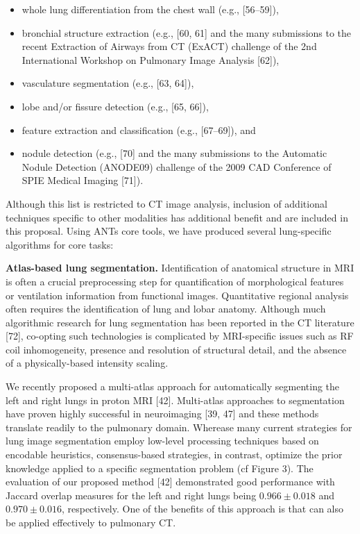 \documentclass[11pt,]{article}
\begin{document}
\begin{itemize}
\itemsep1pt\parskip0pt
\item
  whole lung differentiation from the chest wall (e.g., {[}56--59{]}),
\item
  bronchial structure extraction (e.g., {[}60, 61{]} and the many
  submissions to the recent Extraction of Airways from CT (ExACT)
  challenge of the 2nd International Workshop on Pulmonary Image
  Analysis {[}62{]}),
\item
  vasculature segmentation (e.g., {[}63, 64{]}),
\item
  lobe and/or fissure detection (e.g., {[}65, 66{]}),
\item
  feature extraction and classification (e.g., {[}67--69{]}), and
\item
  nodule detection (e.g., {[}70{]} and the many submissions to the
  Automatic Nodule Detection (ANODE09) challenge of the 2009 CAD
  Conference of SPIE Medical Imaging {[}71{]}).
\end{itemize}

Although this list is restricted to CT image analysis, inclusion of
additional techniques specific to other modalities has additional
benefit and are included in this proposal. Using ANTs core tools, we
have produced several lung-specific algorithms for core tasks:

\textbf{Atlas-based lung segmentation.} Identification of anatomical
structure in MRI is often a crucial preprocessing step for
quantification of morphological features or ventilation information from
functional images. Quantitative regional analysis often requires the
identification of lung and lobar anatomy. Although much algorithmic
research for lung segmentation has been reported in the CT literature
{[}72{]}, co-opting such technologies is complicated by MRI-specific
issues such as RF coil inhomogeneity, presence and resolution of
structural detail, and the absence of a physically-based intensity
scaling.

We recently proposed a multi-atlas approach for automatically segmenting
the left and right lungs in proton MRI {[}42{]}. Multi-atlas approaches
to segmentation have proven highly successful in neuroimaging {[}39,
47{]} and these methods translate readily to the pulmonary domain.
Wherease many current strategies for lung image segmentation employ
low-level processing techniques based on encodable heuristics,
consensus-based strategies, in contrast, optimize the prior knowledge
applied to a specific segmentation problem (cf Figure 3). The evaluation
of our proposed method {[}42{]} demonstrated good performance with
Jaccard overlap measures for the left and right lungs being
$0.966 \pm 0.018$ and $0.970 \pm 0.016$, respectively. One of the
benefits of this approach is that can also be applied effectively to
pulmonary CT.
\end{document}

